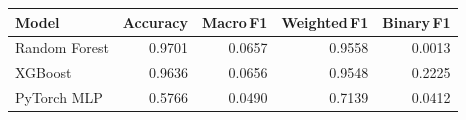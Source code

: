 \begin{tabular}{lrrrr}
  \toprule
  Model & Accuracy & Macro\,F1 & Weighted\,F1 & Binary\,F1 \\ 
  \midrule
  Random Forest & 0.9701 & 0.0657 & 0.9558 & 0.0013 \\
  XGBoost & 0.9636 & 0.0656 & 0.9548 & 0.2225 \\
  PyTorch MLP & 0.5766 & 0.0490 & 0.7139 & 0.0412 \\
  \bottomrule
\end{tabular}